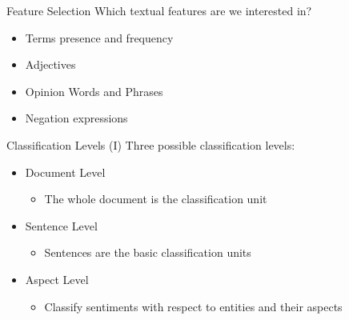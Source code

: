\documentclass[xcolor=dvipsnames]{beamer}
\begin{document}
\begin{frame}{Feature Selection}
Which textual features are we interested in?
\begin{itemize}
\item Terms presence and frequency
\item Adjectives
\item Opinion Words and Phrases
\item Negation expressions
\end{itemize}
\end{frame}

\begin{frame}{Classification Levels (I)}
Three possible classification levels:
\begin{itemize}
\item Document Level 
\begin{itemize}
\item The whole document is the classification unit
\end{itemize}
\item Sentence Level
\begin{itemize}
\item Sentences are the basic classification units
\end{itemize}
\item Aspect Level
\begin{itemize}
\item Classify sentiments with respect to entities and their aspects
\end{itemize}
\end{itemize}
\end{frame}
\end{document}
